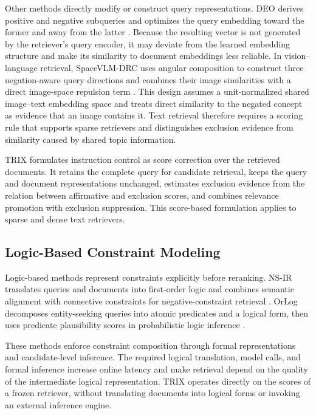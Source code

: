 \documentclass[letterpaper]{article}
\newcommand{\method}{\ifmmode \mathrm{TRIX}\else TRIX\xspace\fi}
\begin{document}
Other methods directly modify or construct query representations.  DEO derives
positive and negative subqueries and optimizes the query embedding toward the
former and away from the latter
\cite{DBLP:journals/corr/abs-2603-09185}.  Because the resulting vector
is not generated by the retriever's query encoder, it may deviate from the
learned embedding structure and make its similarity to document embeddings
less reliable.  In vision--language retrieval,
SpaceVLM-DRC uses
angular composition to construct three negation-aware query directions and
combines their image similarities with a direct image-space repulsion term
\cite{pokhrel2026negation}.  This design assumes a unit-normalized shared
image--text embedding space and treats direct similarity to the negated
concept as evidence that an image contains it.  Text retrieval therefore
requires a scoring rule that supports sparse retrievers and distinguishes
exclusion evidence from similarity caused by shared topic information.

\method{} formulates instruction control as score correction over the
retrieved documents.  It retains the complete query for candidate retrieval,
keeps the query and document representations unchanged, estimates exclusion
evidence from the relation between affirmative and exclusion scores, and
combines relevance promotion with exclusion suppression.  This score-based
formulation applies to sparse and dense text retrievers.

\subsection{Logic-Based Constraint Modeling}

Logic-based methods represent constraints explicitly before reranking.
NS-IR translates queries and documents into first-order logic and combines
semantic alignment with connective constraints for negative-constraint
retrieval \cite{xu2025logical}.  OrLog decomposes entity-seeking queries into
atomic predicates and a logical form, then uses predicate plausibility scores
in probabilistic logic inference \cite{hoveyda2026orlog}.

These methods enforce constraint composition through formal representations
and candidate-level inference.  The required logical translation, model calls,
and formal inference increase online latency and make retrieval depend on the
quality of the intermediate logical representation.  \method{} operates
directly on the scores of a frozen retriever, without translating documents
into logical forms or invoking an external inference engine.
\end{document}
